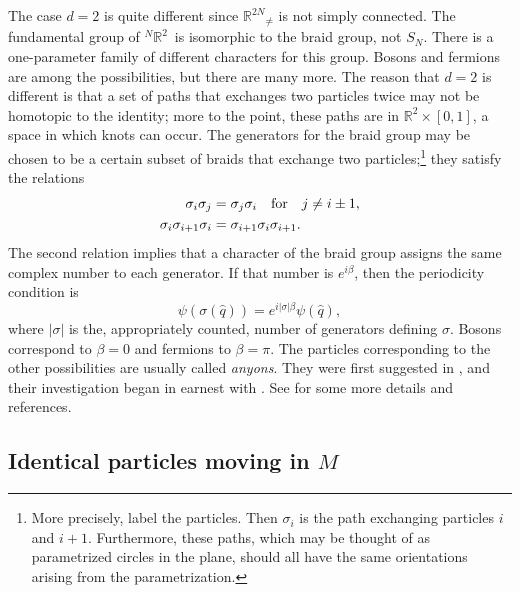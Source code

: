 \documentclass[11pt]{article}
\theoremstyle{remark}
\begin{document}
The case  $d = 2$ is quite different since $\ensuremath{\mathbb{R}^{2N}}_{\neq}$ is not
simply connected. The fundamental group of
 \ensuremath{{}^N\ensuremath{\mathbb{R}^{\ensuremath{2}}}}\ is isomorphic to the braid group, not
\ensuremath{S_N}. There is a 
one-parameter family of different characters for this group. 
Bosons and fermions are among the possibilities, but there are many
more. The reason that $d = 2$ is different 
is that a set of paths that  exchanges two
particles twice may not be homotopic to the identity; more to the
point, these paths are in $\ensuremath{\mathbb{R}^{2}}\times[0,1]$, 
a space in which knots can
occur. 
The generators for
the braid group may be chosen to be a certain subset of 
 braids that exchange two particles;\footnote{More precisely, label
the particles. Then $\sigma_i$ is the path exchanging particles
$i$ and $i+1$. Furthermore, these paths, which  may be thought of as
parametrized 
circles in the plane, should all have the same orientations arising
from the parametrization.} 
they satisfy the relations
\begin{align*} 
\sigma_i \sigma_j &=\sigma_j\sigma_i \quad \hbox{for} \quad j \neq i \pm 1 , \\
\sigma_i\sigma_{i+1}\sigma_i &= \sigma_{i+1}\sigma_i \sigma_{i+1}. 
\end{align*}
The second relation implies that a character of the braid group assigns the same complex number to
each  generator. If that number is $e^{i \beta}$, 
then the periodicity condition is 
\begin{equation*}
\ensuremath{\psi} (\ensuremath{\sigma}(\ensuremath{\hat{q}}))
= e^{i |\ensuremath{\sigma}| \beta}  \ensuremath{\psi}(\ensuremath{\hat{q}}),
\end{equation*} 
where $|\ensuremath{\sigma}|$ is the, appropriately counted, number of generators
defining  $\ensuremath{\sigma}$. Bosons correspond to $\beta = 0$ and fermions to
$\beta = \pi$. 
The particles corresponding to the  other possibilities are
usually called \emph{anyons}. They were first suggested in
\cite{LM77}, and their investigation began in earnest with 
\cite{GMS81, Wi82}. See \cite{Mor92} for some more details and references. 

\subsection{Identical particles moving in $M$}
\end{document}
